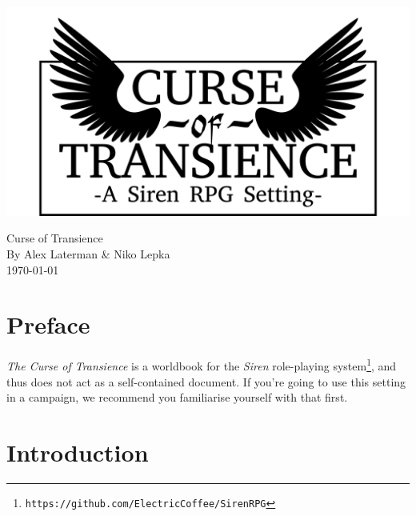 \documentclass[a4paper]{book}
\begin{document}
\begin{titlepage}
    \begin{center}
        \includegraphics[width = \textwidth]{graphics/logo-winged.png}
    \end{center}
\end{titlepage}
\thispagestyle{empty}
\frontmatter
\begin{center}
    \Huge{Curse of Transience}\\
    \Large{By Alex Laterman \& Niko Lepka}\\
    \large{\today}
\end{center}

\chapter*{Preface}
\textit{The Curse of Transience} is a worldbook for the \textit{Siren} role-playing system\footnote{\texttt{https://github.com/ElectricCoffee/SirenRPG}}, and thus does not act as a self-contained document.
If you're going to use this setting in a campaign, we recommend you familiarise yourself with that first.

\chapter*{Introduction}

\tableofcontents
\mainmatter











\end{document}
